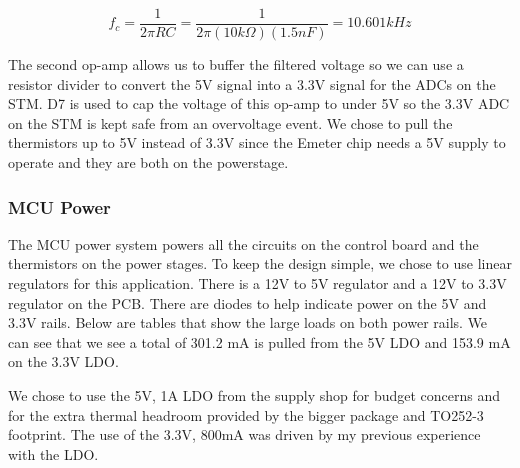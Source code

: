 \begin{equation}
    f_c = \frac{1}{2\pi RC} = \frac{1}{2\pi(10k\Omega)(1.5nF)} = 10.601 kHz
\end{equation}

The second op-amp allows us to buffer the filtered voltage so we can use a resistor divider to convert the 5V signal into a 3.3V signal for the ADCs on the STM.
D7 is used to cap the voltage of this op-amp to under 5V so the 3.3V ADC on the STM is kept safe from an overvoltage event.
We chose to pull the thermistors up to 5V instead of 3.3V since the Emeter chip needs a 5V supply to operate and they are both on the powerstage.

\subsubsection{MCU Power}
The MCU power system powers all the circuits on the control board and the thermistors on the power stages.
To keep the design simple, we chose to use linear regulators for this application.
There is a 12V to 5V regulator and a 12V to 3.3V regulator on the PCB.
There are diodes to help indicate power on the 5V and 3.3V rails.
Below are tables that show the large loads on both power rails.
We can see that we see a total of 301.2 mA is pulled from the 5V LDO and 153.9 mA on the 3.3V LDO.

We chose to use the 5V, 1A LDO from the supply shop for budget concerns and for the extra thermal headroom provided by the bigger package and TO252-3 footprint.
The use of the 3.3V, 800mA was driven by my previous experience with the LDO.

